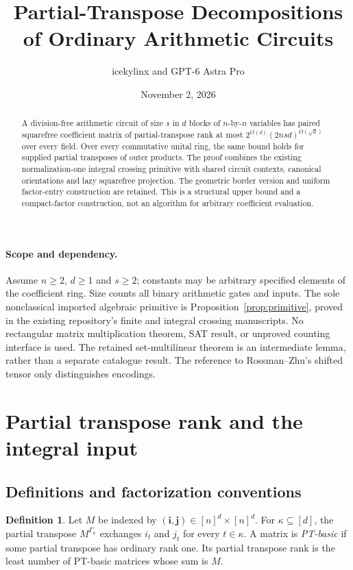 \documentclass[11pt]{article}
\title{Partial-Transpose Decompositions of Ordinary Arithmetic Circuits}
\author{icekylinx and GPT-6 Astra Pro}
\date{November 2, 2026}
\theoremstyle{definition}
\newtheorem{definition}[theorem]{Definition}
\theoremstyle{remark}
\begin{document}
\maketitle
\begin{abstract}
A division-free arithmetic circuit of size $s$ in $d$ blocks of
$n$-by-$n$ variables has paired squarefree coefficient matrix of
partial-transpose rank at most $2^{O(d)}(2nsd)^{O(\sqrt d)}$
over every field. Over every commutative unital ring, the same bound holds
for supplied partial transposes of outer products. The proof combines
the existing normalization-one integral crossing primitive with shared
circuit contexts, canonical orientations and lazy squarefree projection.
The geometric border version and uniform factor-entry construction are
retained. This is a structural upper bound and a compact-factor
construction, not an algorithm for arbitrary coefficient evaluation.
\end{abstract}
\paragraph{Scope and dependency.}
Assume $n\ge2$, $d\ge1$ and $s\ge2$; constants may be arbitrary
specified elements of the coefficient ring. Size counts all binary
arithmetic gates and inputs. The sole nonclassical imported algebraic
primitive is Proposition~\ref{prop:primitive}, proved in the existing
repository's finite and integral crossing manuscripts. No rectangular
matrix multiplication theorem, SAT result, or unproved counting
interface is used. The retained set-multilinear theorem is an intermediate
lemma, rather than a separate catalogue result. The reference to
Rossman--Zhu's shifted tensor only distinguishes encodings.
\section{Partial transpose rank and the integral input}

\subsection{Definitions and factorization conventions}

\begin{definition}
Let $M$ be indexed by $(\mathbf i,\mathbf j)\in[n]^d\times[n]^d$.
For $\kappa\subseteq[d]$, the partial transpose
$M^{\Gamma_\kappa}$ exchanges $i_t$ and $j_t$ for every
$t\in\kappa$. A matrix is \emph{PT-basic} if some partial transpose
has ordinary rank one. Its partial transpose rank is the least
number of PT-basic matrices whose sum is $M$.
\end{definition}
\end{document}
